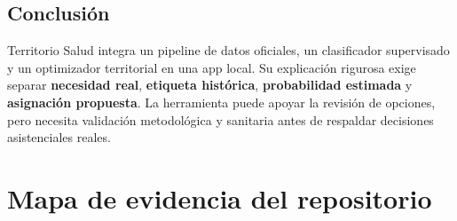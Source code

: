 \documentclass[11pt,a4paper]{report}
\begin{document}
\section{Conclusión}
Territorio Salud integra un pipeline de datos oficiales, un clasificador supervisado y un optimizador territorial en una app local. Su explicación rigurosa exige separar \textbf{necesidad real}, \textbf{etiqueta histórica}, \textbf{probabilidad estimada} y \textbf{asignación propuesta}. La herramienta puede apoyar la revisión de opciones, pero necesita validación metodológica y sanitaria antes de respaldar decisiones asistenciales reales.

\appendix
\chapter{Mapa de evidencia del repositorio}
\small
\end{document}
